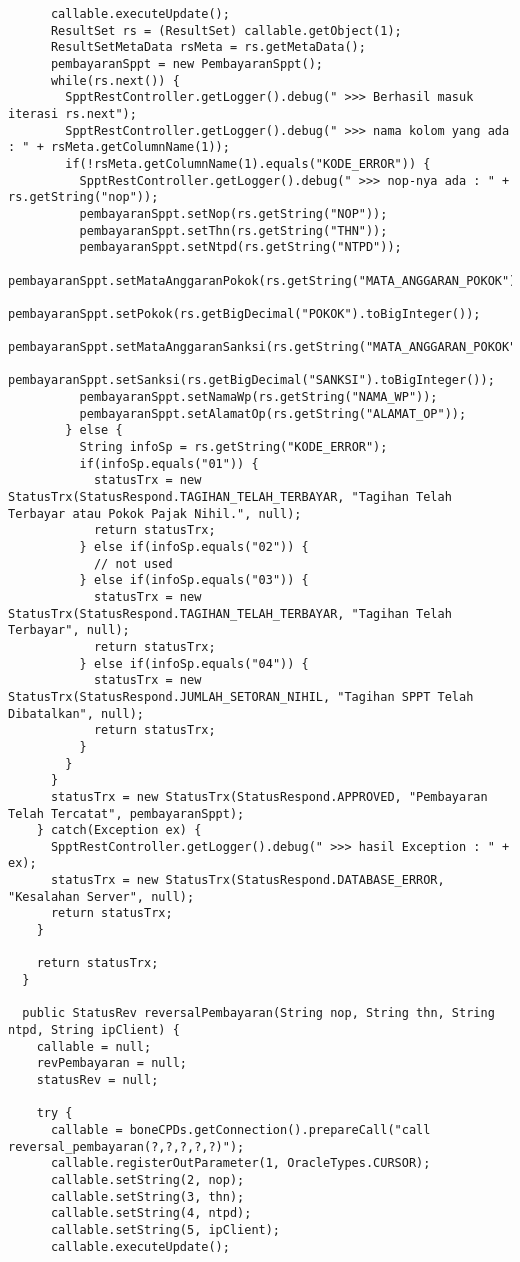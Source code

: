 \documentclass[pdftex,12pt, oneside]{article}
\begin{document}
\begin{lstlisting}
      callable.executeUpdate();
      ResultSet rs = (ResultSet) callable.getObject(1);
      ResultSetMetaData rsMeta = rs.getMetaData();
      pembayaranSppt = new PembayaranSppt();
      while(rs.next()) {
        SpptRestController.getLogger().debug(" >>> Berhasil masuk iterasi rs.next");
        SpptRestController.getLogger().debug(" >>> nama kolom yang ada : " + rsMeta.getColumnName(1));
        if(!rsMeta.getColumnName(1).equals("KODE_ERROR")) {
          SpptRestController.getLogger().debug(" >>> nop-nya ada : " + rs.getString("nop"));
          pembayaranSppt.setNop(rs.getString("NOP"));
          pembayaranSppt.setThn(rs.getString("THN"));
          pembayaranSppt.setNtpd(rs.getString("NTPD"));
          pembayaranSppt.setMataAnggaranPokok(rs.getString("MATA_ANGGARAN_POKOK"));
          pembayaranSppt.setPokok(rs.getBigDecimal("POKOK").toBigInteger());
          pembayaranSppt.setMataAnggaranSanksi(rs.getString("MATA_ANGGARAN_POKOK"));
          pembayaranSppt.setSanksi(rs.getBigDecimal("SANKSI").toBigInteger());
          pembayaranSppt.setNamaWp(rs.getString("NAMA_WP"));
          pembayaranSppt.setAlamatOp(rs.getString("ALAMAT_OP"));
        } else {
          String infoSp = rs.getString("KODE_ERROR");
          if(infoSp.equals("01")) {
            statusTrx = new StatusTrx(StatusRespond.TAGIHAN_TELAH_TERBAYAR, "Tagihan Telah Terbayar atau Pokok Pajak Nihil.", null);
            return statusTrx;
          } else if(infoSp.equals("02")) {
            // not used
          } else if(infoSp.equals("03")) {
            statusTrx = new StatusTrx(StatusRespond.TAGIHAN_TELAH_TERBAYAR, "Tagihan Telah Terbayar", null);
            return statusTrx;
          } else if(infoSp.equals("04")) {
            statusTrx = new StatusTrx(StatusRespond.JUMLAH_SETORAN_NIHIL, "Tagihan SPPT Telah Dibatalkan", null);
            return statusTrx;
          }
        }
      }
      statusTrx = new StatusTrx(StatusRespond.APPROVED, "Pembayaran Telah Tercatat", pembayaranSppt);
    } catch(Exception ex) {
      SpptRestController.getLogger().debug(" >>> hasil Exception : " + ex);
      statusTrx = new StatusTrx(StatusRespond.DATABASE_ERROR, "Kesalahan Server", null);
      return statusTrx;
    }

    return statusTrx;
  }

  public StatusRev reversalPembayaran(String nop, String thn, String ntpd, String ipClient) {
    callable = null;
    revPembayaran = null;
    statusRev = null;

    try {
      callable = boneCPDs.getConnection().prepareCall("call reversal_pembayaran(?,?,?,?,?)");
      callable.registerOutParameter(1, OracleTypes.CURSOR);
      callable.setString(2, nop);
      callable.setString(3, thn);
      callable.setString(4, ntpd);
      callable.setString(5, ipClient);
      callable.executeUpdate();


\end{lstlisting}
\end{document}
